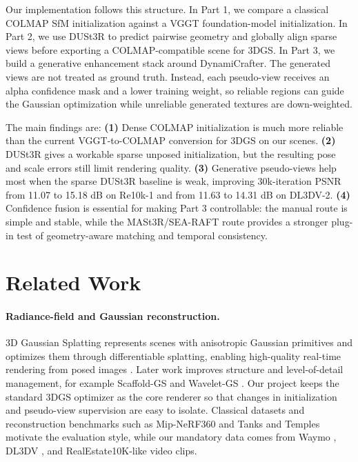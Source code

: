\documentclass[10pt,twocolumn,letterpaper]{article}
\begin{document}
Our implementation follows this structure.  In Part 1, we compare a classical COLMAP SfM initialization against a VGGT foundation-model initialization.  In Part 2, we use DUSt3R to predict pairwise geometry and globally align sparse views before exporting a COLMAP-compatible scene for 3DGS.  In Part 3, we build a generative enhancement stack around DynamiCrafter.  The generated views are not treated as ground truth.  Instead, each pseudo-view receives an alpha confidence mask and a lower training weight, so reliable regions can guide the Gaussian optimization while unreliable generated textures are down-weighted.

The main findings are:
\textbf{(1)} Dense COLMAP initialization is much more reliable than the current VGGT-to-COLMAP conversion for 3DGS on our scenes.
\textbf{(2)} DUSt3R gives a workable sparse unposed initialization, but the resulting pose and scale errors still limit rendering quality.
\textbf{(3)} Generative pseudo-views help most when the sparse DUSt3R baseline is weak, improving 30k-iteration PSNR from 11.07 to 15.18 dB on Re10k-1 and from 11.63 to 14.31 dB on DL3DV-2.
\textbf{(4)} Confidence fusion is essential for making Part 3 controllable: the manual route is simple and stable, while the MASt3R/SEA-RAFT route provides a stronger plug-in test of geometry-aware matching and temporal consistency.

\section{Related Work}

\paragraph{Radiance-field and Gaussian reconstruction.}
3D Gaussian Splatting represents scenes with anisotropic Gaussian primitives and optimizes them through differentiable splatting, enabling high-quality real-time rendering from posed images \cite{kerbl2023gaussian}.  Later work improves structure and level-of-detail management, for example Scaffold-GS \cite{lu2024scaffold} and Wavelet-GS \cite{zhao2025wavelet}.  Our project keeps the standard 3DGS optimizer as the core renderer so that changes in initialization and pseudo-view supervision are easy to isolate.  Classical datasets and reconstruction benchmarks such as Mip-NeRF360 \cite{barron2022mipnerf} and Tanks and Temples \cite{knapitsch2017tanks} motivate the evaluation style, while our mandatory data comes from Waymo \cite{sun2020waymo}, DL3DV \cite{ling2024dl3dv}, and RealEstate10K-like video clips.
\end{document}
